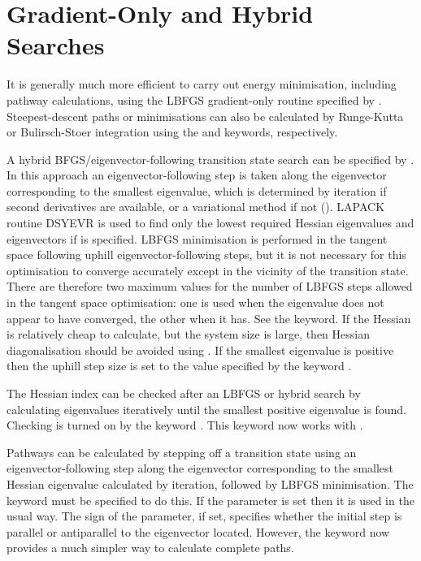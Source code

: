 {{{\section{Gradient-Only and Hybrid Searches}
\label{sec:gradient}
It is generally much more efficient to carry out energy minimisation, including
pathway calculations, using the LBFGS gradient-only routine specified by
{}. Steepest-descent
paths or minimisations can also be calculated by Runge-Kutta or Bulirsch-Stoer integration
using the {} and {} keywords, respectively.

A hybrid BFGS/eigenvector-following
transition state search\cite{munrow99,kumedamw01} can be specified by {}. In this approach
an eigenvector-following step is taken along the eigenvector corresponding to
the smallest eigenvalue, which is determined by iteration if second derivatives are
available, or a variational method if not ({}). 
LAPACK routine { DSYEVR} is used to find only the lowest required Hessian eigenvalues
and eigenvectors if {} is specified.
LBFGS minimisation is performed in the tangent space following uphill eigenvector-following
steps, but it is not necessary for
this optimisation to converge accurately except in the vicinity of the transition state.
There are therefore two maximum values for the number of LBFGS steps
allowed in the tangent space optimisation: one is used when the eigenvalue does
not appear to have converged, the other when it has. See the {} keyword.
If the Hessian is relatively cheap to calculate, but the system size is large, then
Hessian diagonalisation should be avoided using {}.
If the smallest eigenvalue is positive then the uphill step size is set to the value
specified by the keyword {}.

The Hessian index can be checked after an LBFGS or hybrid search by calculating 
eigenvalues iteratively until the smallest positive eigenvalue is found. Checking is
turned on by the keyword {}. This keyword now works with {}.

Pathways can be calculated by stepping off a transition state using an eigenvector-following
step along the eigenvector corresponding to the smallest Hessian eigenvalue calculated
by iteration, followed by LBFGS minimisation. The keyword {}
must be specified to do this. If the {}
parameter is set then it is used in the usual way. The sign of the {} parameter,
if set, specifies whether the initial step is parallel or antiparallel to the
eigenvector located. However, the  keyword now provides a much simpler way
to calculate complete paths.

}}}
